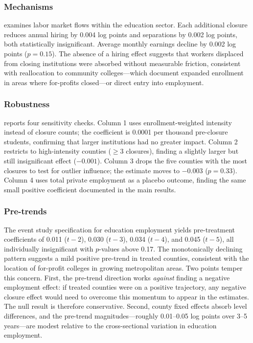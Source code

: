 \documentclass[12pt]{article}
\begin{document}
\subsubsection*{Mechanisms}  examines labor market flows within the education sector. Each additional closure reduces annual hiring by 0.004 log points and separations by 0.002 log points, both statistically insignificant. Average monthly earnings decline by 0.002 log points ($p = 0.15$). The absence of a hiring effect suggests that workers displaced from closing institutions were absorbed without measurable friction, consistent with reallocation to community colleges---which \citet{liu2019effect} document expanded enrollment in areas where for-profits closed---or direct entry into employment.



\subsubsection*{Robustness}  reports four sensitivity checks. Column 1 uses enrollment-weighted intensity instead of closure counts; the coefficient is 0.0001 per thousand pre-closure students, confirming that larger institutions had no greater impact. Column 2 restricts to high-intensity counties ($\geq 3$ closures), finding a slightly larger but still insignificant effect ($-0.001$). Column 3 drops the five counties with the most closures to test for outlier influence; the estimate moves to $-0.003$ ($p = 0.33$). Column 4 uses total private employment as a placebo outcome, finding the same small positive coefficient documented in the main results.



\subsubsection*{Pre-trends} The event study specification for education employment yields pre-treatment coefficients of 0.011 ($t-2$), 0.030 ($t-3$), 0.034 ($t-4$), and 0.045 ($t-5$), all individually insignificant with $p$-values above 0.17. The monotonically declining pattern suggests a mild positive pre-trend in treated counties, consistent with the location of for-profit colleges in growing metropolitan areas. Two points temper this concern. First, the pre-trend direction works \textit{against} finding a negative employment effect: if treated counties were on a positive trajectory, any negative closure effect would need to overcome this momentum to appear in the estimates. The null result is therefore conservative. Second, county fixed effects absorb level differences, and the pre-trend magnitudes---roughly 0.01--0.05 log points over 3--5 years---are modest relative to the cross-sectional variation in education employment.
\end{document}
